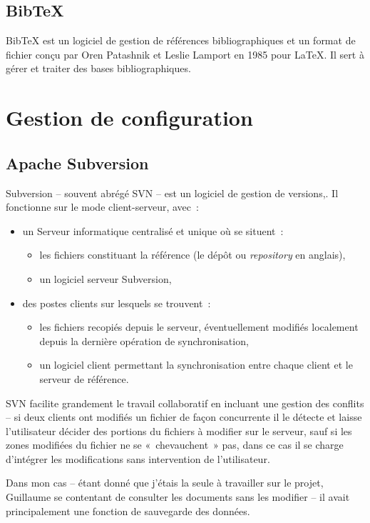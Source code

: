 		
		\subsection{BibTeX}
			BibTeX est un logiciel de gestion de références bibliographiques et un format de fichier conçu par Oren Patashnik et Leslie Lamport en 1985 pour \LaTeX. Il sert à gérer et traiter des bases bibliographiques.
		
		
\section{Gestion de configuration}
	\subsection{Apache Subversion}
		Subversion -- souvent abrégé SVN -- est un logiciel de gestion de versions,. Il fonctionne sur le mode client-serveur, avec~:
		\begin{itemize}
			\item un Serveur informatique centralisé et unique où se situent~:
			\begin{itemize}
				\item les fichiers constituant la référence (le dépôt ou \textit{repository} en anglais),
				\item un logiciel serveur Subversion,
			\end{itemize}
			\item des postes clients sur lesquels se trouvent~:
			\begin{itemize}
				\item les fichiers recopiés depuis le serveur, éventuellement modifiés localement depuis la dernière opération de synchronisation,
				\item un logiciel client permettant la synchronisation entre chaque client et le serveur de référence.
			\end{itemize}
		\end{itemize}
		
		SVN facilite grandement le travail collaboratif en incluant une gestion des conflits -- si deux clients ont modifiés un fichier de façon concurrente il le détecte et laisse l'utilisateur décider des portions du fichiers à modifier sur le serveur, sauf si les zones modifiées du fichier ne se «~chevauchent~» pas, dans ce cas il se charge d'intégrer les modifications sans intervention de l'utilisateur.
		
		Dans mon cas -- étant donné que j'étais la seule à travailler sur le projet, Guillaume se contentant de consulter les documents sans les modifier -- il avait principalement une fonction de sauvegarde des données.